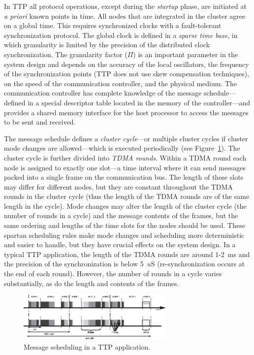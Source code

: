 In TTP all protocol operations, except during the \emph{startup}
phase, are initiated at \emph{a priori} known points in time. All
nodes that are integrated in the cluster agree on a global time. This
requires synchronized clocks with a fault-tolerant
synchronization protocol. The global clock is defined in a
\emph{sparse time base}, in which granularity is limited by the
precision of the distributed clock synchronization. The granularity
factor ($\Pi$) is an important parameter in the system design and
depends on the accuracy of the local oscillators, the frequency of
the synchronization points (TTP does not use skew compensation
techniques), on the speed of the communication controller, and the
physical medium. The communication controller has complete knowledge
of the message schedule---defined in a special descriptor table
located in the memory of the controller---and provides a shared
memory interface for the host processor to access the messages to be
sent and received.

The message schedule defines a \emph{cluster cycle}---or multiple
cluster cycles if cluster mode changes are allowed---which is
executed periodically (see Figure~\ref{fig:TTPSchedule}). The
cluster cycle is further divided into \emph{TDMA rounds}. Within a
TDMA round each node is assigned to exactly one slot---a time
interval where it can send messages packed into a single frame on
the communication bus. The length of these slots may differ for
different nodes, but they are constant throughout the TDMA rounds in the
cluster cycle (thus the length of the TDMA rounds are of the same
length in the cycle). Mode changes may alter the length of the
cluster cycle (the number of rounds in a cycle) and the message
contents of the frames, but the same ordering and lengths
of the time slots for the nodes should be used. These spartan scheduling rules make
mode changes and scheduling more deterministic and easier to handle,
but they have crucial effects on the system design. In a typical TTP
application, the length of the TDMA rounds are around 1-2~ms and the
precision of the synchronization is below 5~$u$S (re-synchronization
occurs at the end of each round). However, the number of rounds in a cycle
varies substantially, as do the length and contents of the frames.

\begin{figure}[h]
   \includegraphics[width=3in]{TTPSchedule}
   \caption{Message scheduling in a TTP application.}
   \label{fig:TTPSchedule}
\end{figure}

